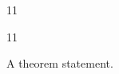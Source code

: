 \documentclass[paper=A4]{ropas-poster}
\begin{document}
\begin{postergrid}{1}{1}
\begin{posterblock}{1}{1}
\begin{theorem}A theorem statement.\end{theorem}
\end{posterblock}
\end{postergrid}
\end{document}
